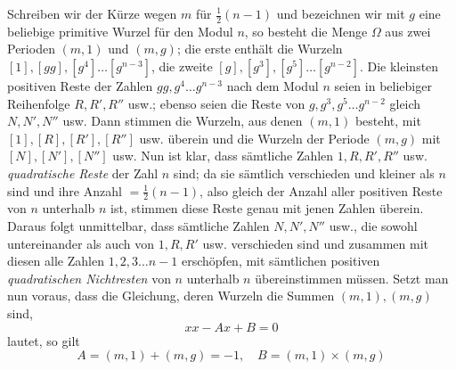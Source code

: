 Schreiben wir der Kürze wegen \(m\) für \(\frac12(n-1)\) und bezeichnen wir mit \(g\) eine beliebige primitive Wurzel für den Modul \(n\), so besteht die Menge \(\Omega\) aus zwei Perioden \((m,1)\) und \((m,g)\); die erste enthält die Wurzeln \([1],\allowbreak [gg],\allowbreak [g^4]\ldots[g^{n-3}]\), die zweite \([g],\allowbreak [g^3],\allowbreak [g^5]\ldots[g^{n-2}]\). Die kleinsten positiven Reste der Zahlen \(gg,\allowbreak g^4\ldots g^{n-3}\) nach dem Modul \(n\) seien in beliebiger Reihenfolge \(R,\allowbreak R',\allowbreak R''\) usw.; ebenso seien die Reste von \(g,\allowbreak g^3,\allowbreak g^5\ldots g^{n-2}\) gleich \(N,\allowbreak N',\allowbreak N''\) usw. Dann stimmen die Wurzeln, aus denen \((m,1)\) besteht, mit \([1],\allowbreak [R],\allowbreak [R'],\allowbreak [R'']\) usw. überein und die Wurzeln der Periode \((m,g)\) mit \([N],\allowbreak [N'],\allowbreak [N'']\) usw. Nun ist klar, dass sämtliche Zahlen \(1,\allowbreak R,\allowbreak R',\allowbreak R''\) usw. \textit{quadratische Reste} der Zahl \(n\) sind; da sie sämtlich verschieden und kleiner als \(n\) sind und ihre Anzahl \(=\frac12(n-1)\), also gleich der Anzahl aller positiven Reste von \(n\) unterhalb \(n\) ist, stimmen diese Reste genau mit jenen Zahlen überein. Daraus folgt unmittelbar, dass sämtliche Zahlen \(N,\allowbreak N',\allowbreak N''\) usw., die sowohl untereinander als auch von \(1,\allowbreak R,\allowbreak R'\) usw. verschieden sind und zusammen mit diesen alle Zahlen \(1,\allowbreak 2,\allowbreak 3\ldots n-1\) erschöpfen, mit sämtlichen positiven \textit{quadratischen Nichtresten} von \(n\) unterhalb \(n\) übereinstimmen müssen. Setzt man nun voraus, dass die Gleichung, deren Wurzeln die Summen \((m,1),\allowbreak (m,g)\) sind, \[xx-Ax+B=0\] lautet, so gilt \[A=(m,1)+(m,g)=-1,\quad B=(m,1)\times(m,g)\]

